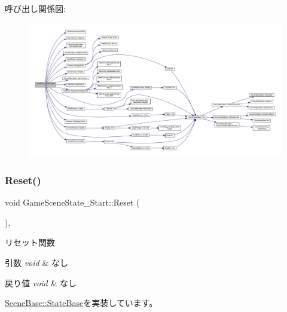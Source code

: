 呼び出し関係図\+:
\nopagebreak
\begin{figure}[H]
\begin{center}
\leavevmode
\includegraphics[width=350pt]{class_game_scene_state___start_ae921c57f349fbb2f00a197d40a3404b7_cgraph}
\end{center}
\end{figure}
\mbox{\label{class_game_scene_state___start_a59270f7b65613f580864ed8ea3056179}} 
\subsubsection{\texorpdfstring{Reset()}{Reset()}}
{\footnotesize\ttfamily void Game\+Scene\+State\+\_\+\+Start\+::\+Reset (\begin{DoxyParamCaption}{ }\end{DoxyParamCaption})\hspace{0.3cm}{\ttfamily [override]}, {\ttfamily [virtual]}}



リセット関数 


\begin{DoxyParams}{引数}
{\em void} & なし \\
\hline
\end{DoxyParams}

\begin{DoxyRetVals}{戻り値}
{\em void} & なし \\
\hline
\end{DoxyRetVals}


\mbox{\hyperlink{class_scene_base_1_1_state_base_a2e14a3afece0b1d8db9edcebf514a977}{Scene\+Base\+::\+State\+Base}}を実装しています。



